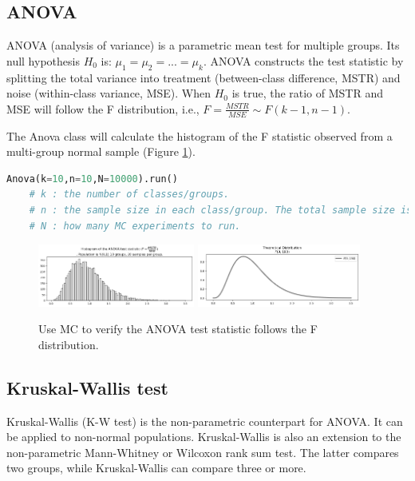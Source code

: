 \documentclass[11pt, letterpaper]{article}
\begin{document}
\subsection{ANOVA}
ANOVA (analysis of variance) is a parametric mean test for multiple groups. Its null hypothesis $H_{0}$ is: $\mu_{1}=\mu_{2}=...=\mu_{k}$.
ANOVA constructs the test statistic by splitting the total variance into treatment (between-class difference, MSTR) and noise (within-class variance, MSE).
When $H_{0}$ is true, the ratio of MSTR and MSE will follow the F distribution, i.e., $F=\frac{MSTR}{MSE} \sim F(k-1,n-1)$.

The Anova class will calculate the histogram of the F statistic observed from a multi-group normal sample (Figure \ref{fig:anova mc}).

\lstset{
    basicstyle=\footnotesize,
    xleftmargin=-1em,aboveskip=0.5em,belowskip=0.5em
}
\begin{lstlisting}[language=python]
    Anova(k=10,n=10,N=10000).run()
    # k : the number of classes/groups.
    # n : the sample size in each class/group. The total sample size is [k]*[n].
    # N : how many MC experiments to run.
    \end{lstlisting}

\begin{figure}[htbp]
    \centering
    \includegraphics[width=0.46\textwidth]{fig10-anova mc1.png}
    \includegraphics[width=0.48\textwidth]{fig10-anova mc2.png}
    \caption{Use MC to verify the ANOVA test statistic follows the F distribution.}
    \label{fig:anova mc}
\end{figure}

\subsection{Kruskal-Wallis test}
Kruskal-Wallis (K-W test) is the non-parametric counterpart for ANOVA. It can be applied to non-normal
populations. Kruskal-Wallis is also an extension to the non-parametric Mann-Whitney or Wilcoxon rank sum test.
The latter compares two groups, while Kruskal-Wallis can compare three or more.
\end{document}

